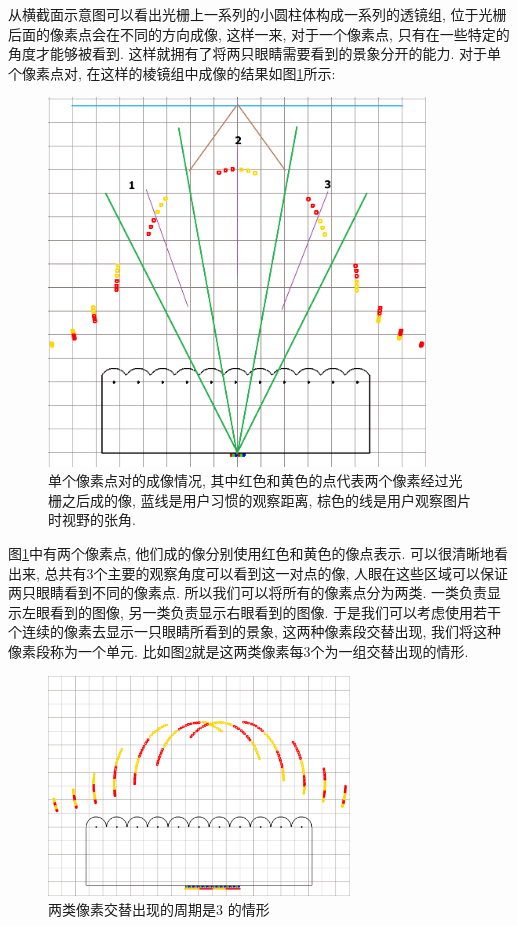 \documentclass[a4paper, 11pt]{article}
\begin{document}
\begin{CJK}{UTF8}{gbsn}
从横截面示意图可以看出光栅上一系列的小圆柱体构成一系列的透镜组, 位于光栅后面的像素点会在不同的方向成像, 这样一来, 对于一个像素点, 只有在一些特定的角度才能够被看到. 这样就拥有了将两只眼睛需要看到的景象分开的能力. 对于单个像素点对, 在这样的棱镜组中成像的结果如图\ref{fig:217}所示:
\begin{figure}[h!]
  \centerline{\includegraphics[width=10cm]{217.png}}
  \caption{单个像素点对的成像情况, 其中红色和黄色的点代表两个像素经过光栅之后成的像, 蓝线是用户习惯的观察距离, 棕色的线是用户观察图片时视野的张角.}
  \label{fig:217}
\end{figure}

图\ref{fig:217}中有两个像素点, 他们成的像分别使用红色和黄色的像点表示. 可以很清晰地看出来, 总共有3个主要的观察角度可以看到这一对点的像, 人眼在这些区域可以保证两只眼睛看到不同的像素点. 所以我们可以将所有的像素点分为两类. 一类负责显示左眼看到的图像, 另一类负责显示右眼看到的图像. 于是我们可以考虑使用若干个连续的像素去显示一只眼睛所看到的景象, 这两种像素段交替出现, 我们将这种像素段称为一个单元. 比如图\ref{fig:223}就是这两类像素每3个为一组交替出现的情形.
\begin{figure}[h!]
  \centerline{\includegraphics[width=8cm]{223.png}}
  \caption{两类像素交替出现的周期是3 的情形}
  \label{fig:223}
\end{figure}


\end{CJK}
\end{document}
